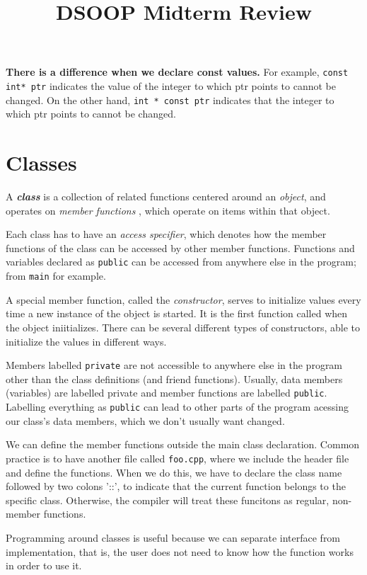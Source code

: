 \documentclass{article}
\title{DSOOP Midterm Review}
\begin{document}
\maketitle
\textbf{There is a difference when we declare const values.}
For example, \texttt{const int* ptr} indicates the value of the integer to which ptr points to cannot be changed.
On the other hand, \texttt{int * const ptr} indicates that the integer to which ptr points to cannot 
be changed.
\section{Classes}
A \textbf{\textit{class}} is a collection of related functions centered around an \textit{object}, and operates
on \textit{member functions} , which operate on items within that object.

Each class has to have an \textit{access specifier}, which denotes how the member functions of the class can 
be accessed by other member functions. Functions and variables declared as \texttt{public} can be accessed 
from anywhere else in the program; from \texttt{main} for example. 

A special member function, called the \textit{constructor}, serves to initialize values every time a new 
instance of the object is started. It is the first function called when the object iniitializes. There 
can be several different types of constructors, able to initialize the values in different ways.

Members labelled \texttt{private} are not accessible to anywhere else in the program other than the 
class definitions (and friend functions).  Usually, data members (variables) are labelled private 
and member functions are labelled \texttt{public}. Labelling everything as \texttt{public} can lead
to other parts of the program acessing our class's data members, which we don't usually want changed.

We can define the member functions outside the main class declaration. Common practice is to have another
file called \texttt{foo.cpp}, where we include the header file and define the functions. When we do this, 
we have to declare the class name followed by two colons '::', to indicate that the current function belongs
to the specific class. Otherwise, the compiler will treat these funcitons as regular, non-member functions.

Programming around classes is useful because we can separate interface from implementation, that is, the user
does not need to know how the function works in order to use it. 
\end{document}
